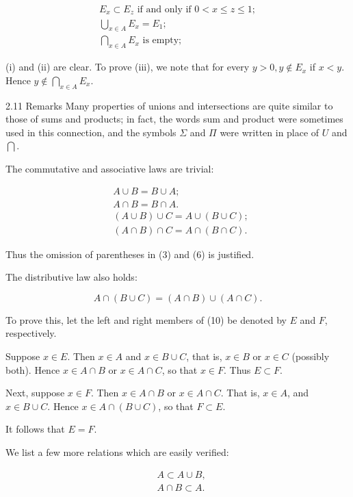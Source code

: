 \documentclass[10pt]{article}
\begin{document}
$$
\begin{gathered}
E_{x} \subset E_{z} \text { if and only if } 0<x \leq z \leq 1 ; \\
\bigcup_{x \in A} E_{x}=E_{1} ; \\
\bigcap_{x \in A} E_{x} \text { is empty; }
\end{gathered}
$$

(i) and (ii) are clear. To prove (iii), we note that for every $y>0, y \notin E_{x}$ if $x<y$. Hence $y \notin \bigcap_{x \in A} E_{x}$.

2.11 Remarks Many properties of unions and intersections are quite similar to those of sums and products; in fact, the words sum and product were sometimes used in this connection, and the symbols $\Sigma$ and $\Pi$ were written in place of $U$ and $\bigcap$.

The commutative and associative laws are trivial:

$$
\begin{aligned}
& A \cup B=B \cup A \text {; } \\
& A \cap B=B \cap A . \\
& (A \cup B) \cup C=A \cup(B \cup C) \text {; } \\
& (A \cap B) \cap C=A \cap(B \cap C) \text {. }
\end{aligned}
$$

Thus the omission of parentheses in (3) and (6) is justified.

The distributive law also holds:

$$
A \cap(B \cup C)=(A \cap B) \cup(A \cap C) .
$$

To prove this, let the left and right members of (10) be denoted by $E$ and $F$, respectively.

Suppose $x \in E$. Then $x \in A$ and $x \in B \cup C$, that is, $x \in B$ or $x \in C$ (possibly both). Hence $x \in A \cap B$ or $x \in A \cap C$, so that $x \in F$. Thus $E \subset F$.

Next, suppose $x \in F$. Then $x \in A \cap B$ or $x \in A \cap C$. That is, $x \in A$, and $x \in B \cup C$. Hence $x \in A \cap(B \cup C)$, so that $F \subset E$.

It follows that $E=F$.

We list a few more relations which are easily verified:

$$
\begin{aligned}
& A \subset A \cup B, \\
& A \cap B \subset A .
\end{aligned}
$$
\end{document}
